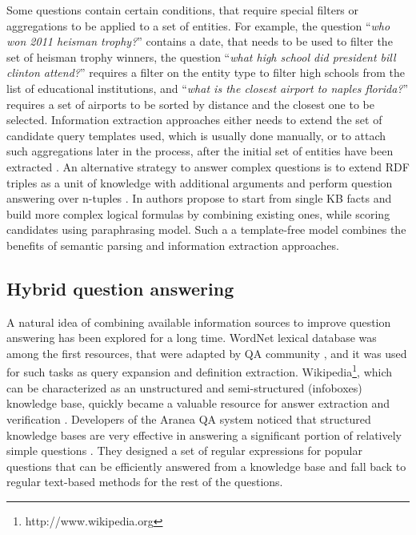 Some questions contain certain conditions, that require special filters or aggregations to be applied to a set of entities. 
For example, the question ``\textit{who won 2011 heisman trophy?}'' contains a date, that needs to be used to filter the set of heisman trophy winners, the question ``\textit{what high school did president bill clinton attend?}'' requires a filter on the entity type to filter high schools from the list of educational institutions, and ``\textit{what is the closest airport to naples florida?}'' requires a set of airports to be sorted by distance and the closest one to be selected.
Information extraction approaches either needs to extend the set of candidate query templates used, which is usually done manually, or to attach such aggregations later in the process, after the initial set of entities have been extracted \cite{yih:ACL:2015:STAGG}.
An alternative strategy to answer complex questions is to extend RDF triples as a unit of knowledge with additional arguments and perform question answering over n-tuples \cite{yin2015answering}.
In \cite{wang2015large} authors propose to start from single KB facts and build more complex logical formulas by combining existing ones, while scoring candidates using paraphrasing model.
Such a a template-free model combines the benefits of semantic parsing and information extraction approaches.


\subsection{Hybrid question answering}
\label{sec:rel_work:factoid:hybrid}

A natural idea of combining available information sources to improve question answering has been explored for a long time.
WordNet lexical database \cite{miller1995wordnet} was among the first resources, that were adapted by QA community \cite{hovy2001use,pasca2001informative}, and it was used for such tasks as query expansion and definition extraction.
Wikipedia\footnote{http://www.wikipedia.org}, which can be characterized as an unstructured and semi-structured (infoboxes) knowledge base, quickly became a valuable resource for answer extraction and verification \cite{ahn2005using,buscaldi2006mining}.
Developers of the Aranea QA system noticed that structured knowledge bases are very effective in answering a significant portion of relatively simple questions \cite{lin2003question}.
They designed a set of regular expressions for popular questions that can be efficiently answered from a knowledge base and fall back to regular text-based methods for the rest of the questions.


